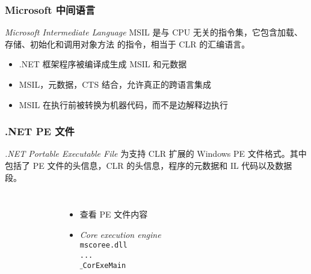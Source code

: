 \begin{frame}
\frametitle{Microsoft 中间语言}

\begin{block}{\textit{Microsoft Intermediate Language}}
  \CJKindent MSIL 是与 CPU 无关的指令集，它包含加载、存储、初始化和调用对象方法
  的指令，相当于 CLR 的汇编语言。
\end{block}
\pause

\begin{itemize}
\item \small .NET 框架程序被编译成生成 MSIL 和元数据
\item \small MSIL，元数据，CTS 结合，允许真正的跨语言集成
\item \small MSIL 在执行前被转换为机器代码，而不是边解释边执行
\end{itemize}
\pause

\begin{figure}[h] 
  \centering 
\end{figure}

\end{frame}

\begin{frame}
\frametitle{ .NET PE 文件}
\begin{block}{\textit{.NET Portable Executable File}}
\CJKindent \small  为支持 CLR 扩展的 Windows PE 文件格式。其中包括了 PE 文件的头信息，CLR 的头信息，程序的元数据和
  IL 代码以及数据段。
\end{block}
\pause
\begin{columns}
  \begin{figure}[htbp]
    \centering
    
  \end{figure}
\pause
\begin{itemize}
\item 查看 PE 文件内容\\
{\footnotesize {}}
\vskip4pt
\item \textit{Core execution engine} \\
{\color{red!40!black} \texttt{mscoree.dll}\\
\texttt{...}\\
\texttt{$\_$CorExeMain}}

\end{itemize}
\end{columns}

\end{frame}

